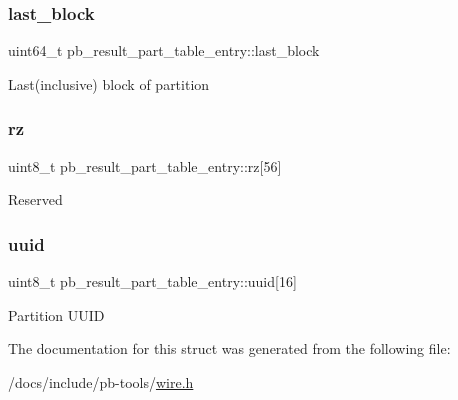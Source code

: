 \subsubsection{\texorpdfstring{last\+\_\+block}{last\_block}}
{\footnotesize\ttfamily uint64\+\_\+t pb\+\_\+result\+\_\+part\+\_\+table\+\_\+entry\+::last\+\_\+block}

Last(inclusive) block of partition \mbox{\label{structpb__result__part__table__entry_a29434ef5700b5218b552b4589f9eeb84}} 
\subsubsection{\texorpdfstring{rz}{rz}}
{\footnotesize\ttfamily uint8\+\_\+t pb\+\_\+result\+\_\+part\+\_\+table\+\_\+entry\+::rz\mbox{[}56\mbox{]}}

Reserved \mbox{\label{structpb__result__part__table__entry_ab2c25d3e918316995cb10bf8c5b6e570}} 
\subsubsection{\texorpdfstring{uuid}{uuid}}
{\footnotesize\ttfamily uint8\+\_\+t pb\+\_\+result\+\_\+part\+\_\+table\+\_\+entry\+::uuid\mbox{[}16\mbox{]}}

Partition U\+U\+ID 

The documentation for this struct was generated from the following file\+:\begin{DoxyCompactItemize}
\item 
/docs/include/pb-\/tools/\hyperlink{wire_8h}{wire.\+h}\end{DoxyCompactItemize}
